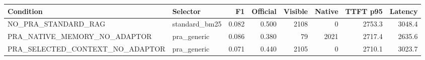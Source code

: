 \begin{tabular}{llrrrrrr}
\toprule
Condition & Selector & F1 & Official & Visible & Native & TTFT p95 & Latency \\
\midrule
NO\_PRA\_STANDARD\_RAG & standard\_bm25 & 0.082 & 0.500 & 2108 & 0 & 2753.3 & 3048.4 \\
PRA\_NATIVE\_MEMORY\_NO\_ADAPTOR & pra\_generic & 0.086 & 0.380 & 79 & 2021 & 2717.4 & 2635.6 \\
PRA\_SELECTED\_CONTEXT\_NO\_ADAPTOR & pra\_generic & 0.071 & 0.440 & 2105 & 0 & 2710.1 & 3023.7 \\
\bottomrule
\end{tabular}
